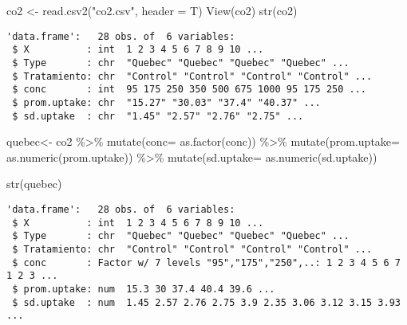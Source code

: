 \documentclass[
  letterpaper,
  DIV=11,
  numbers=noendperiod]{scrartcl}
\newenvironment{Shaded}{\begin{snugshade}}{\end{snugshade}}
\newcommand{\AttributeTok}[1]{\textcolor[rgb]{0.40,0.45,0.13}{#1}}
\newcommand{\FunctionTok}[1]{\textcolor[rgb]{0.28,0.35,0.67}{#1}}
\newcommand{\NormalTok}[1]{\textcolor[rgb]{0.00,0.23,0.31}{#1}}
\newcommand{\OtherTok}[1]{\textcolor[rgb]{0.00,0.23,0.31}{#1}}
\newcommand{\SpecialCharTok}[1]{\textcolor[rgb]{0.37,0.37,0.37}{#1}}
\newcommand{\StringTok}[1]{\textcolor[rgb]{0.13,0.47,0.30}{#1}}
\begin{document}
\begin{Shaded}
\begin{Highlighting}[]
\NormalTok{co2 }\OtherTok{\textless{}{-}} \FunctionTok{read.csv2}\NormalTok{(}\StringTok{"co2.csv"}\NormalTok{, }\AttributeTok{header =}\NormalTok{ T)}
\FunctionTok{View}\NormalTok{(co2)}
\FunctionTok{str}\NormalTok{(co2)}
\end{Highlighting}
\end{Shaded}

\begin{verbatim}
'data.frame':   28 obs. of  6 variables:
 $ X          : int  1 2 3 4 5 6 7 8 9 10 ...
 $ Type       : chr  "Quebec" "Quebec" "Quebec" "Quebec" ...
 $ Tratamiento: chr  "Control" "Control" "Control" "Control" ...
 $ conc       : int  95 175 250 350 500 675 1000 95 175 250 ...
 $ prom.uptake: chr  "15.27" "30.03" "37.4" "40.37" ...
 $ sd.uptake  : chr  "1.45" "2.57" "2.76" "2.75" ...
\end{verbatim}

\begin{Shaded}
\begin{Highlighting}[]
\NormalTok{quebec}\OtherTok{\textless{}{-}}\NormalTok{ co2 }\SpecialCharTok{\%\textgreater{}\%} \FunctionTok{mutate}\NormalTok{(}\AttributeTok{conc=} \FunctionTok{as.factor}\NormalTok{(conc)) }\SpecialCharTok{\%\textgreater{}\%} 
  \FunctionTok{mutate}\NormalTok{(}\AttributeTok{prom.uptake=} \FunctionTok{as.numeric}\NormalTok{(prom.uptake)) }\SpecialCharTok{\%\textgreater{}\%} \FunctionTok{mutate}\NormalTok{(}\AttributeTok{sd.uptake=} \FunctionTok{as.numeric}\NormalTok{(sd.uptake))}

\FunctionTok{str}\NormalTok{(quebec)}
\end{Highlighting}
\end{Shaded}

\begin{verbatim}
'data.frame':   28 obs. of  6 variables:
 $ X          : int  1 2 3 4 5 6 7 8 9 10 ...
 $ Type       : chr  "Quebec" "Quebec" "Quebec" "Quebec" ...
 $ Tratamiento: chr  "Control" "Control" "Control" "Control" ...
 $ conc       : Factor w/ 7 levels "95","175","250",..: 1 2 3 4 5 6 7 1 2 3 ...
 $ prom.uptake: num  15.3 30 37.4 40.4 39.6 ...
 $ sd.uptake  : num  1.45 2.57 2.76 2.75 3.9 2.35 3.06 3.12 3.15 3.93 ...
\end{verbatim}
\end{document}

